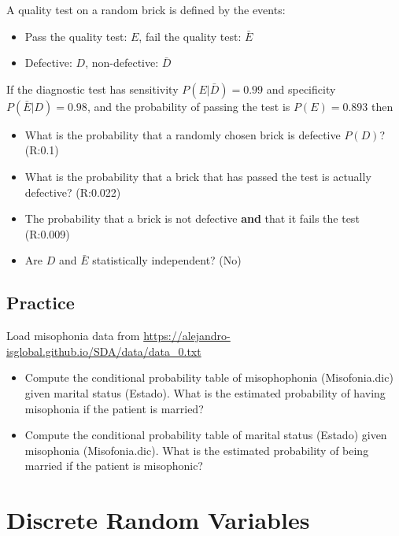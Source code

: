 \documentclass[
]{book}
\providecommand{\tightlist}{%
  \setlength{\itemsep}{0pt}\setlength{\parskip}{0pt}}
\begin{document}
A quality test on a random brick is defined by the events:

\begin{itemize}
\tightlist
\item
  Pass the quality test: \(E\), fail the quality test: \(\bar{E}\)
\item
  Defective: \(D\), non-defective: \(\bar{D}\)
\end{itemize}

If the diagnostic test has sensitivity \(P(E|\bar{D })= 0.99\) and specificity \(P(\bar{E}|D)=0.98\), and the probability of passing the test is \(P(E) =0.893\) then

\begin{itemize}
\item
  What is the probability that a randomly chosen brick is defective \(P(D)\)? (R:0.1)
\item
  What is the probability that a brick that has passed the test is actually defective? (R:0.022)
\item
  The probability that a brick is not defective \textbf{and} that it fails the test (R:0.009)
\item
  Are \(D\) and \(\bar{E}\) statistically independent? (No)
\end{itemize}

\hypertarget{practice-2}{%
\section{Practice}\label{practice-2}}

Load misophonia data from \url{https://alejandro-isglobal.github.io/SDA/data/data_0.txt}

\begin{itemize}
\item
  Compute the conditional probability table of misophophonia (Misofonia.dic) given marital status (Estado). What is the estimated probability of having misophonia if the patient is married?
\item
  Compute the conditional probability table of marital status (Estado) given misophonia (Misofonia.dic). What is the estimated probability of being married if the patient is misophonic?
\end{itemize}

\hypertarget{discrete-random-variables}{%
\chapter{Discrete Random Variables}\label{discrete-random-variables}}
\end{document}
